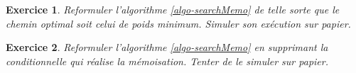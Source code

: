 \documentclass[11pt,openany]{book}
\newtheorem{exo}{Exercice}[chapter]
\newcommand{\ac}[1]{{\sc #1}} %
\begin{document}

\begin{exo}
Reformuler l'algorithme \ref{algo-searchMemo} de telle sorte que le chemin optimal 
soit celui de poids minimum.  Simuler son exécution sur papier.
\end{exo}
\begin{exo}
Reformuler l'algorithme \ref{algo-searchMemo} en supprimant la conditionnelle qui réalise la mémoisation.  Tenter de le simuler sur papier.
\end{exo}
\end{document}
